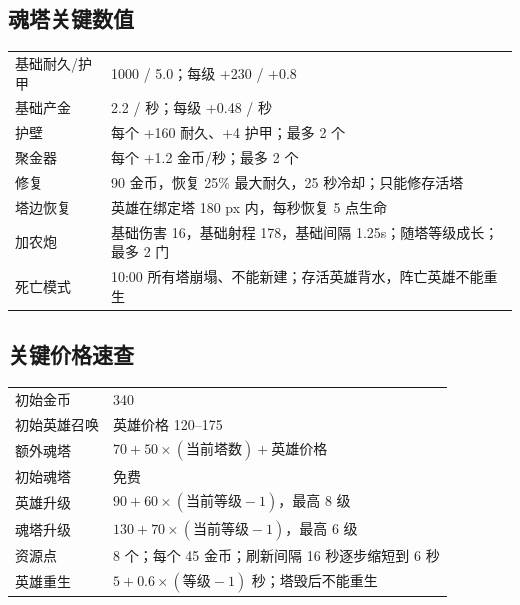 \documentclass{ctexart}
\begin{document}
\subsection*{魂塔关键数值}

{\footnotesize
\begin{tabularx}{\textwidth}{@{}l X@{}}
基础耐久/护甲 & 1000 / 5.0；每级 +230 / +0.8 \\
基础产金 & 2.2 / 秒；每级 +0.48 / 秒 \\
护壁 & 每个 +160 耐久、+4 护甲；最多 2 个 \\
聚金器 & 每个 +1.2 金币/秒；最多 2 个 \\
修复 & 90 金币，恢复 25\% 最大耐久，25 秒冷却；只能修存活塔 \\
塔边恢复 & 英雄在绑定塔 180 px 内，每秒恢复 5 点生命 \\
加农炮 & 基础伤害 16，基础射程 178，基础间隔 1.25s；随塔等级成长；最多 2 门 \\
死亡模式 & 10:00 所有塔崩塌、不能新建；存活英雄背水，阵亡英雄不能重生 \\
\end{tabularx}
}

\subsection*{关键价格速查}

{\footnotesize
\begin{tabularx}{\textwidth}{@{}l X@{}}
初始金币 & 340 \\
初始英雄召唤 & 英雄价格 120--175 \\
额外魂塔 & $70 + 50\times(\text{当前塔数}) + \text{英雄价格}$ \\
初始魂塔 & 免费 \\
英雄升级 & $90 + 60\times(\text{当前等级}-1)$，最高 8 级 \\
魂塔升级 & $130 + 70\times(\text{当前等级}-1)$，最高 6 级 \\
资源点 & 8 个；每个 45 金币；刷新间隔 16 秒逐步缩短到 6 秒 \\
英雄重生 & $5 + 0.6\times(\text{等级}-1)$ 秒；塔毁后不能重生 \\
\end{tabularx}
}
\end{document}
